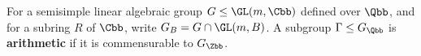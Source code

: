 \documentclass{amsart}
\begin{document}
For a semisimple linear algebraic group $G \leq \GL(m,\Cbb)$ defined over $\Qbb$, and for a subring $R$ of $\Cbb$, write $G_{B} = G \cap \GL(m,B)$. A subgroup $\Gamma \leq G_{\Qbb}$ is \textbf{arithmetic} if it is commensurable to $G_{\Zbb}$.
\end{document}
